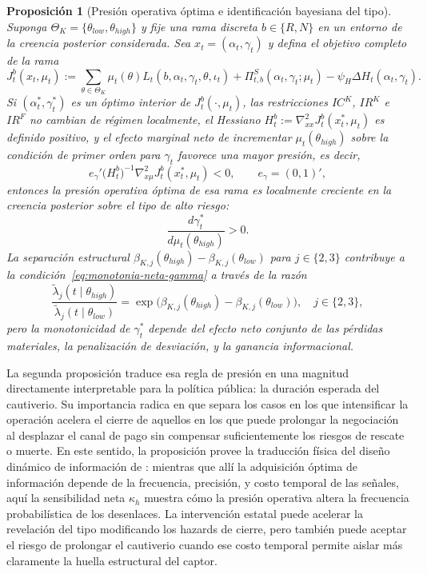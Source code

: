 \documentclass[review,authoryear,12pt]{elsarticle}
\theoremstyle{plain}
\newtheorem{proposition}[theorem]{Proposición}
\theoremstyle{definition}
\newcommand{\ThetaK}{\Theta_K}
\newcommand{\1}{\mathbf{1}}
\begin{document}
\begin{proposition}[Presión operativa óptima e identificación bayesiana del tipo]
\label{prop:optimal-gamma-beliefs}
Suponga $\ThetaK=\{\theta_{low},\theta_{high}\}$ y fije una rama discreta $b\in\{R,N\}$ en un entorno de la creencia posterior considerada. Sea $x_t=(\alpha_t,\gamma_t)$ y defina el objetivo completo de la rama
\begin{equation}
\label{eq:obj-rama-completo}
J_t^b(x_t,\mu_t)
:=
\sum_{\theta\in\ThetaK}\mu_t(\theta)L_t(b,\alpha_t,\gamma_t,\theta,\iota_t)
+\Pi_{t,b}^{S}(\alpha_t,\gamma_t;\mu_t)
-\psi_H\Delta H_t(\alpha_t,\gamma_t).
\end{equation}
Si $(\alpha_t^\ast,\gamma_t^\ast)$ es un óptimo interior de $J_t^b(\cdot,\mu_t)$, las restricciones $IC^K$, $IR^K$ e $IR^F$ no cambian de régimen localmente, el Hessiano $H_t^b:=\nabla_{xx}^2J_t^b(x_t^\ast,\mu_t)$ es definido positivo, y el efecto marginal neto de incrementar $\mu_t(\theta_{high})$ sobre la condición de primer orden para $\gamma_t$ favorece una mayor presión, es decir,
\begin{equation}
\label{eq:monotonia-neta-gamma}
e_\gamma'
\bigl(H_t^b\bigr)^{-1}
\nabla_{x\mu}^2J_t^b(x_t^\ast,\mu_t)
<0,
\qquad
e_\gamma=(0,1)',
\end{equation}
entonces la presión operativa óptima de esa rama es localmente creciente en la creencia posterior sobre el tipo de alto riesgo:
\[
\frac{d\gamma_t^\ast}{d\mu_t(\theta_{high})} > 0.
\]
La separación estructural $\beta_{K,j}(\theta_{high})-\beta_{K,j}(\theta_{low})$ para $j\in\{2,3\}$ contribuye a la condición~\eqref{eq:monotonia-neta-gamma} a través de la razón
\[
\frac{\tilde\lambda_j(t\mid\theta_{high})}{\tilde\lambda_j(t\mid\theta_{low})}
=\exp\!\bigl(\beta_{K,j}(\theta_{high})-\beta_{K,j}(\theta_{low})\bigr),
\quad j\in\{2,3\},
\]
pero la monotonicidad de $\gamma_t^\ast$ depende del efecto neto conjunto de las pérdidas materiales, la penalización de desviación, y la ganancia informacional.
\end{proposition}

\noindent La segunda proposición traduce esa regla de presión en una magnitud directamente interpretable para la política pública: la duración esperada del cautiverio. Su importancia radica en que separa los casos en los que intensificar la operación acelera el cierre de aquellos en los que puede prolongar la negociación al desplazar el canal de pago sin compensar suficientemente los riesgos de rescate o muerte. En este sentido, la proposición provee la traducción física del diseño dinámico de información de \citet{Zhong2022}: mientras que allí la adquisición óptima de información depende de la frecuencia, precisión, y costo temporal de las señales, aquí la sensibilidad neta $\kappa_h$ muestra cómo la presión operativa altera la frecuencia probabilística de los desenlaces. La intervención estatal puede acelerar la revelación del tipo modificando los hazards de cierre, pero también puede aceptar el riesgo de prolongar el cautiverio cuando ese costo temporal permite aislar más claramente la huella estructural del captor.
\end{document}

